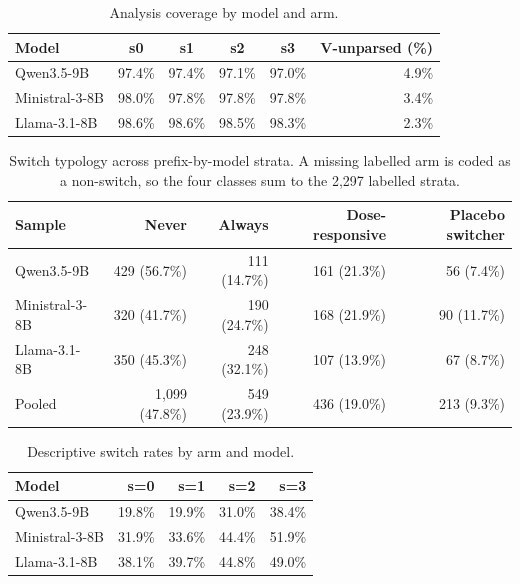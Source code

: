 \documentclass[a4paper,fleqn]{cas-sc}
\begin{document}
\begin{table}[pos=htbp]
  \centering
  \caption{Analysis coverage by model and arm.}
  \label{tab:missing}
  \small
  \begin{tabular}{lccccr}
    \toprule
    \textbf{Model} & \textbf{s0} & \textbf{s1} & \textbf{s2} & \textbf{s3} & \textbf{V-unparsed (\%)} \\
    \midrule
    Qwen3.5-9B     & 97.4\% & 97.4\% & 97.1\% & 97.0\% & 4.9\% \\
    Ministral-3-8B & 98.0\% & 97.8\% & 97.8\% & 97.8\% & 3.4\% \\
    Llama-3.1-8B   & 98.6\% & 98.6\% & 98.5\% & 98.3\% & 2.3\% \\
    \bottomrule
  \end{tabular}
\end{table}

\begin{table}[pos=htbp]
  \centering
  \caption{Switch typology across prefix-by-model strata. A missing labelled arm is coded as a
  non-switch, so the four classes sum to the 2{,}297 labelled strata.}
  \label{tab:typology}
  \small
  \begin{tabular}{lrrrr}
    \toprule
    \textbf{Sample} & \textbf{Never} & \textbf{Always} & \textbf{Dose-responsive} & \textbf{Placebo switcher} \\
    \midrule
    Qwen3.5-9B     & 429 (56.7\%) & 111 (14.7\%) & 161 (21.3\%) & 56 (7.4\%) \\
    Ministral-3-8B & 320 (41.7\%) & 190 (24.7\%) & 168 (21.9\%) & 90 (11.7\%) \\
    Llama-3.1-8B   & 350 (45.3\%) & 248 (32.1\%) & 107 (13.9\%) & 67 (8.7\%) \\
    \midrule
    Pooled         & 1{,}099 (47.8\%) & 549 (23.9\%) & 436 (19.0\%) & 213 (9.3\%) \\
    \bottomrule
  \end{tabular}
\end{table}

\begin{table}[pos=htbp]
  \centering
  \caption{Descriptive switch rates by arm and model.}
  \label{tab:armrates}
  \small
  \begin{tabular}{lrrrr}
    \toprule
    \textbf{Model} & \textbf{s=0} & \textbf{s=1} & \textbf{s=2} & \textbf{s=3} \\
    \midrule
    Qwen3.5-9B     & 19.8\% & 19.9\% & 31.0\% & 38.4\% \\
    Ministral-3-8B & 31.9\% & 33.6\% & 44.4\% & 51.9\% \\
    Llama-3.1-8B   & 38.1\% & 39.7\% & 44.8\% & 49.0\% \\
    \bottomrule
  \end{tabular}
\end{table}
\end{document}
